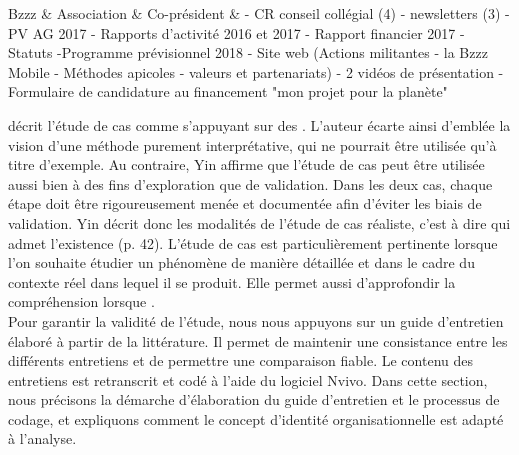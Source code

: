 \begin{longtable}
        Bzzz	& Association	& Co-président
        & - CR conseil collégial (4) \newline - newsletters (3) \newline - PV AG 2017 \newline - Rapports d'activité 2016 et 2017 \newline - Rapport financier 2017 \newline - Statuts \newline -Programme prévisionnel 2018 \newline - Site web (Actions militantes - la Bzzz Mobile - Méthodes apicoles - valeurs et partenariats) \newline - 2 vidéos de présentation \newline - Formulaire de candidature au financement "mon projet pour la planète"
        \\ \hline

\end{longtable}

    \textcite[][p. 29]{yin2009case} décrit l'étude de cas comme  s'appuyant sur des . L'auteur écarte ainsi d'emblée la vision d'une méthode purement interprétative, qui ne pourrait être utilisée qu'à titre d'exemple. Au contraire, Yin affirme que l'étude de cas peut être utilisée aussi bien à des fins d'exploration que de validation. Dans les deux cas, chaque étape doit être rigoureusement menée et documentée afin d'éviter les biais de validation. Yin décrit donc les modalités de l'étude de cas réaliste, c'est à dire qui admet l'existence  (p. 42).
    L'étude de cas est particulièrement pertinente lorsque l'on souhaite étudier un phénomène de manière détaillée et dans le cadre du contexte réel dans lequel il se produit. Elle permet aussi d'approfondir la compréhension lorsque  \parencite[][p. 41]{yin2009case}. \\

    Pour garantir la validité de l'étude, nous nous appuyons sur un guide d'entretien élaboré à partir de la littérature. Il permet de maintenir une consistance entre les différents entretiens et de permettre une comparaison fiable. Le contenu des entretiens est retranscrit et codé à l'aide du logiciel Nvivo. Dans cette section, nous précisons la démarche d'élaboration du guide d'entretien et le processus de codage, et expliquons comment le concept d'identité organisationnelle est adapté à l'analyse.


